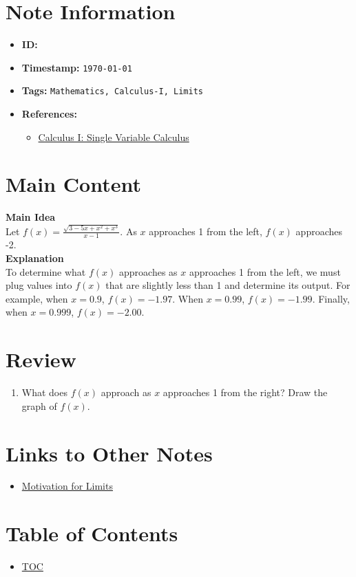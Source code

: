 \clearpage
{}
\label{202501070739}
\renewcommand{\notetitle}{Moving Closer and Closer}

\section*{Note Information}
\begin{itemize}
  \item \textbf{ID:} \texttt{\jobname}
  \item \textbf{Timestamp:} \texttt{\today \ \currenttime}
  \item \textbf{Tags:} \texttt{Mathematics, Calculus-I, Limits}
  \item \textbf{References:}
    \begin{itemize}
      \item \href{https://ocw.mit.edu/courses/18-01-calculus-i-single-variable-calculus-fall-2020/}{Calculus I: Single Variable Calculus}
    \end{itemize}
\end{itemize}


\section*{Main Content}
\textbf{Main Idea}\\
Let $f(x) = \frac{\sqrt{3-5x+x^2+x^3}}{x-1}$. As $x$ approaches 1 from the left, $f(x)$ approaches -2. \\

\textbf{Explanation}\\
To determine what $f(x)$ approaches as $x$ approaches 1 from the left, we must plug values into $f(x)$ that are slightly less than 1 and determine its output.
For example, when $x = 0.9$, $f(x) = -1.97$. When $x = 0.99$, $f(x) = -1.99$. Finally, when $x = 0.999$, $f(x) = -2.00$. \\

\section*{Review}
\begin{enumerate}
  \item What does $f(x)$ approach as $x$ approaches 1 from the right? Draw the graph of $f(x)$. 
\end{enumerate}


\section*{Links to Other Notes}
\begin{itemize}
  \item \hyperref[202501050700]{Motivation for Limits}
\end{itemize}

\section*{Table of Contents}
\begin{itemize}
  \item \hyperref[toc]{TOC}
\end{itemize}

